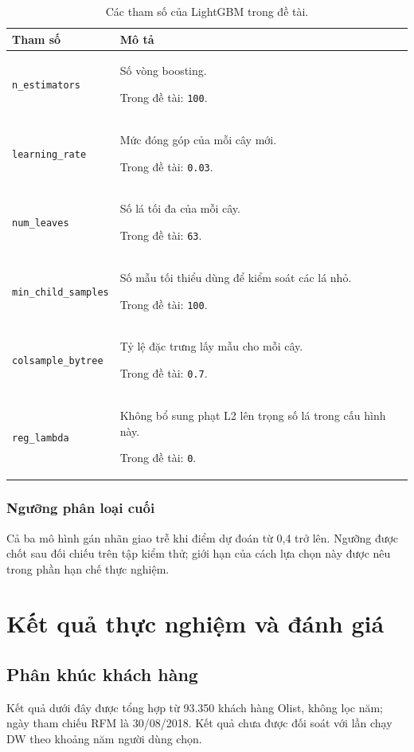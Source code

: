 \documentclass[a4paper]{article}
\begin{document}
\begin{table}[H]
\centering
\small
\caption{Các tham số của LightGBM trong đề tài.}
\label{tab:lgbm-parameters}
\begin{tabularx}{\textwidth}{|p{3.7cm}|X|}
\hline
\textbf{Tham số} & \textbf{Mô tả} \\ \hline
\texttt{n\_estimators} & Số vòng boosting.\par\smallskip Trong đề tài: \texttt{100}. \\ \hline
\texttt{learning\_rate} & Mức đóng góp của mỗi cây mới.\par\smallskip Trong đề tài: \texttt{0.03}. \\ \hline
\texttt{num\_leaves} & Số lá tối đa của mỗi cây.\par\smallskip Trong đề tài: \texttt{63}. \\ \hline
\texttt{min\_child\_samples} & Số mẫu tối thiểu dùng để kiểm soát các lá nhỏ.\par\smallskip Trong đề tài: \texttt{100}. \\ \hline
\texttt{colsample\_bytree} & Tỷ lệ đặc trưng lấy mẫu cho mỗi cây.\par\smallskip Trong đề tài: \texttt{0.7}. \\ \hline
\texttt{reg\_lambda} & Không bổ sung phạt L2 lên trọng số lá trong cấu hình này.\par\smallskip Trong đề tài: \texttt{0}. \\ \hline
\end{tabularx}
\end{table}

\subsubsection{Ngưỡng phân loại cuối}
Cả ba mô hình gán nhãn giao trễ khi điểm dự đoán từ 0,4 trở lên. Ngưỡng được chốt sau đối chiếu trên tập kiểm thử; giới hạn của cách lựa chọn này được nêu trong phần hạn chế thực nghiệm.

\section{Kết quả thực nghiệm và đánh giá}
\subsection{Phân khúc khách hàng}
Kết quả dưới đây được tổng hợp từ 93.350 khách hàng Olist, không lọc năm; ngày tham chiếu RFM là 30/08/2018. Kết quả chưa được đối soát với lần chạy DW theo khoảng năm người dùng chọn.
\end{document}
